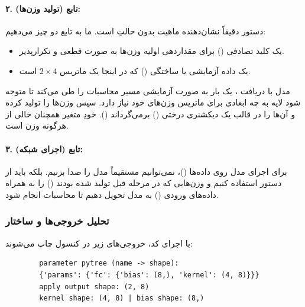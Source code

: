 \documentclass{article}
\begin{document}
\paragraph{۲. تابع  (تولید وزن‌ها):}
دستور  دقیقاً نشان‌دهنده ماهیت بدون حالتِ  است. ما به تابع  دو چیز می‌دهیم:
\begin{itemize}
	\item یک کلید تصادفی () برای مقداردهی اولیه وزن‌ها به صورت قطعی و تکرارپذیر.
	\item یک داده آزمایشی یا ساختگی () که در اینجا یک ماتریس $2 \times 4$ است.
\end{itemize}
مدل با دریافت ، یک بار به صورت آزمایشی مسیر محاسبات را طی می‌کند تا متوجه شود لایه  به چه ابعادی برای ماتریس وزن‌های خود نیاز دارد. سپس وزن‌ها را تولید کرده و آن‌ها را در قالب یک دیکشنری درختی () برمی‌گرداند (). خودِ متغیر  همچنان خالی از هرگونه وزن است.

\paragraph{۳. تابع  (اجرای شبکه):}
برای اجرای مدل روی داده‌ها ()، نمی‌توانیم مستقیماً مدل را صدا بزنیم. بلکه باید از دستور  استفاده کنیم و وزن‌هایی که در مرحله قبل تولید شده بودند () را به همراه داده‌های ورودی () به مدل تحویل دهیم تا محاسبات انجام شود.

\subsubsection*{تحلیل خروجی‌ها و ساختار }

با اجرای کد، خروجی‌های زیر در کنسول چاپ می‌شوند:

\begin{latin}
	\begin{lstlisting}
		parameter pytree (name -> shape):
		{'params': {'fc': {'bias': (8,), 'kernel': (4, 8)}}}
		apply output shape: (2, 8)
		kernel shape: (4, 8) | bias shape: (8,)
	\end{lstlisting}
\end{latin}
\end{document}
